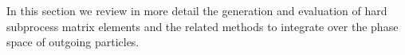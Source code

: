 In this section we review in more detail the generation and evaluation
of hard subprocess matrix elements and the related 
methods to integrate over the phase space of outgoing particles.
\label{Sec:TL_ME}


\label{Sec:PS_ME}


\label{Sec:Inter_ME}

